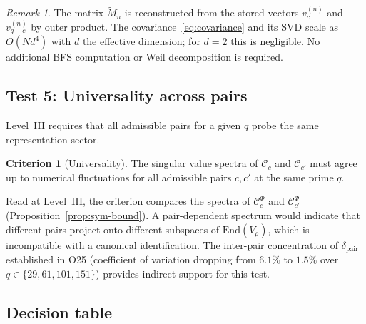 \documentclass[12pt,a4paper]{article}
\theoremstyle{definition}
\newtheorem{criterion}[theorem]{Criterion}
\theoremstyle{remark}
\newtheorem{remark}[theorem]{Remark}
\begin{document}
    \begin{remark}
      The matrix $\widetilde{M}_n$ is reconstructed from the stored vectors
      $v_c^{(n)}$ and $v_{q-c}^{(n)}$ by outer product.
      The covariance~\eqref{eq:covariance} and its SVD scale as $O(N d^4)$
      with $d$ the effective dimension; for $d = 2$ this is negligible.
      No additional BFS computation or Weil decomposition is required.
    \end{remark}

  \subsection{Test 5: Universality across pairs}
    \label{sec:test5}

    Level~III requires that all admissible pairs for a given $q$ probe the same
    representation sector.

    \begin{criterion}[Universality]
  The singular value spectra of $\mathcal{C}_c$ and $\mathcal{C}_{c'}$ must agree
  up to numerical fluctuations for all admissible pairs $c, c'$ at the same
  prime $q$.
    \end{criterion}

    Read at Level~III, the criterion compares the spectra of $\mathcal{C}^{\Phi}_c$ and
    $\mathcal{C}^{\Phi}_{c'}$ (Proposition~\ref{prop:sym-bound}).
    A pair-dependent spectrum would indicate that different pairs project onto
    different subspaces of $\mathrm{End}(V_\rho)$, which is incompatible with a
    canonical identification.
    The inter-pair concentration of $\delta_{\mathrm{pair}}$ established in
    O25 (coefficient of variation dropping from $6.1\%$ to $1.5\%$
    over $q \in \{29, 61, 101, 151\}$) provides indirect support for this test.

  \subsection{Decision table}
    \label{sec:decision}
\end{document}
